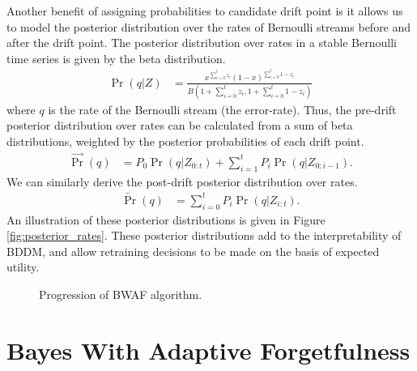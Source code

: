 Another benefit of assigning probabilities to candidate drift point is it allows us to model the posterior distribution over the rates of Bernoulli streams before and after the drift point. The posterior distribution over rates in a stable Bernoulli time series is given by the beta distribution.
\begin{align}
  \Pr(q|Z) &= \frac{ x^{\sum_{i=0}^t z_i}(1-x)^{\sum_{i=0}^t 1-z_i} }{B\left(1+\sum_{i=0}^t z_i,1+\sum_{i=0}^t 1-z_i\right)} \label{eq:rate_posterior}
\end{align}
where $q$ is the rate of the Bernoulli stream (the error-rate). Thus, the pre-drift posterior distribution over rates can be calculated from a sum of beta distributions, weighted by the posterior probabilities of each drift point.
\begin{align}
  \overrightarrow{\Pr}(q) &= P_0 \Pr(q|Z_{0:t}) + \sum_{i=1}^t P_i \Pr(q|Z_{0:i-1}).
\end{align}
We can similarly derive the post-drift posterior distribution over rates.
\begin{align}
  \overleftarrow{\Pr}(q) &= \sum_{i=0}^t P_i \Pr(q|Z_{i:t}).
\end{align}
An illustration of these posterior distributions is given in Figure \ref{fig:posterior_rates}. These posterior distributions add to the interpretability of BDDM, and allow retraining decisions to be made on the basis of expected utility.

\begin{figure}
    \centering
    \caption{Progression of BWAF algorithm.}
    \label{fig:bwaf_progress}
\end{figure}


\section{Bayes With Adaptive Forgetfulness} \label{BDD:BWAF}

